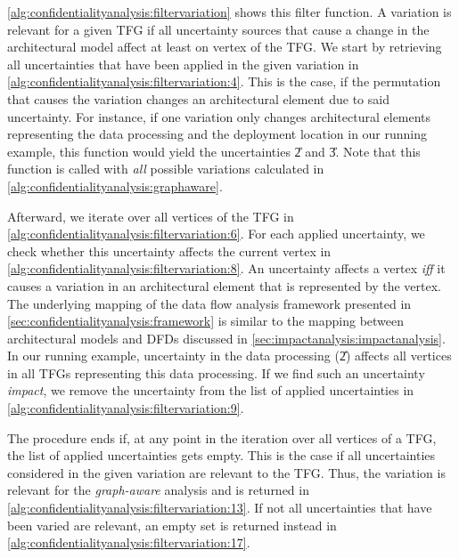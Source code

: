 \autoref{alg:confidentialityanalysis:filtervariation} shows this filter function.
A variation is relevant for a given \ac{TFG} if all uncertainty sources that cause a change in the architectural model affect at least on vertex of the \ac{TFG}.
We start by retrieving all uncertainties that have been applied in the given variation in \autoref{alg:confidentialityanalysis:filtervariation:4}.
This is the case, if the permutation that causes the variation \cite{mehl_palladio_2022} changes an architectural element due to said uncertainty.
For instance, if one variation only changes architectural elements representing the data processing and the deployment location in our running example, this function would yield the uncertainties \U{2} and \U{3}.
Note that this function is called with \emph{all} possible variations calculated in \autoref{alg:confidentialityanalysis:graphaware}.

Afterward, we iterate over all vertices of the \ac{TFG} in \autoref{alg:confidentialityanalysis:filtervariation:6}.
For each applied uncertainty, we check whether this uncertainty affects the current vertex in \autoref{alg:confidentialityanalysis:filtervariation:8}.
An uncertainty affects a vertex \emph{iff} it causes a variation in an architectural element that is represented by the vertex.
The underlying mapping of the data flow analysis framework presented in \autoref{sec:confidentialityanalysis:framework} is similar to the mapping between architectural models and \acp{DFD} discussed in \autoref{sec:impactanalysis:impactanalysis}.
In our running example, uncertainty in the data processing (\U{2}) affects all vertices in all \acp{TFG} representing this data processing.
If we find such an uncertainty \emph{impact}, we remove the uncertainty from the list of applied uncertainties in \autoref{alg:confidentialityanalysis:filtervariation:9}.

The procedure ends if, at any point in the iteration over all vertices of a \ac{TFG}, the list of applied uncertainties gets empty.
This is the case if all uncertainties considered in the given variation are relevant to the \ac{TFG}.
Thus, the variation is relevant for the \emph{graph-aware} analysis and is returned in \autoref{alg:confidentialityanalysis:filtervariation:13}.
If not all uncertainties that have been varied are relevant, an empty set is returned instead in \autoref{alg:confidentialityanalysis:filtervariation:17}.

